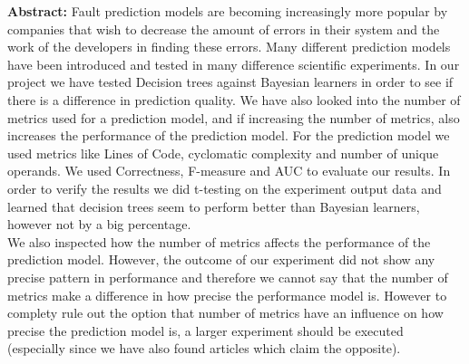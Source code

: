 \textbf{Abstract:} Fault prediction models are becoming increasingly more popular by companies that wish to decrease the amount of errors in their system and the work of the developers in finding these errors. Many different prediction models have been introduced and tested in many difference scientific experiments. In our project we have tested Decision trees against Bayesian learners in order to see if there is a difference in prediction quality. We have also looked into the number of metrics used for a prediction model, and if increasing the number of metrics, also increases the performance of the prediction model. For the prediction model we used metrics like Lines of Code, cyclomatic complexity and number of unique operands. We used   Correctness, F-measure and AUC to evaluate our results. In order to verify the results we did t-testing on the experiment output data and learned that decision trees seem to perform better than Bayesian learners, however not by a big percentage. \\ We also inspected how the number of metrics affects the performance of the prediction model. However, the outcome of our experiment did not show any precise pattern in performance and therefore we cannot say that the number of metrics make a difference in how precise the performance model is. However to complety rule out the option that number of metrics have an influence on how precise the prediction model is, a larger experiment should be executed (especially since we have also found articles which claim the opposite). 